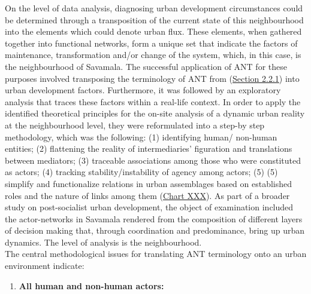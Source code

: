 \documentclass[11pt]{report}
\begin{document}
{{{{On the level of data analysis, diagnosing urban development circumstances could be determined through a transposition of the current state of this neighbourhood into the elements which could denote urban flux. These elements, when gathered together into functional networks, form a unique set that indicate the factors of maintenance, transformation and/or change of the system, which, in this case, is the neighbourhood of Savamala. The successful application of ANT for these purposes involved transposing the terminology of ANT from (\href{Section 2.2.1}{Section 2.2.1}) into urban development factors. Furthermore, it was followed by an exploratory analysis that traces these factors within a real-life context. In order to apply the identified theoretical principles for the on-site analysis of a dynamic urban reality at the neighbourhood level, they were reformulated into a step-by step methodology, which was the following: (1) identifying human/ non-human entities; (2) flattening the reality of
intermediaries’ figuration and translations between mediators; (3) traceable associations among those who were constituted as actors; (4) tracking stability/instability of agency among actors; (5) (5) simplify and functionalize relations in urban assemblages based on established roles and the nature of links among them (\href{Table ANT discource analysos}{Chart XXX}). As part of a broader study on post-socialist urban development, the object of examination included the actor-networks in Savamala rendered from the composition of different layers of decision making that, through coordination and predominance, bring up urban dynamics. The level of analysis is the neighbourhood. 
\\

The central methodological issues for translating ANT terminology onto an urban environment indicate:
 
\begin{enumerate}
\item \textbf{All human and non-human actors:}


\end{enumerate}}}}}
\end{document}
